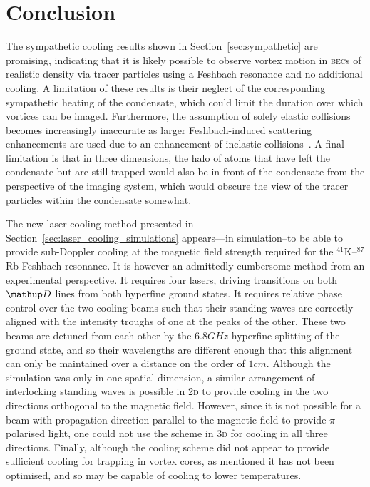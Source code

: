 \section{Conclusion}

The sympathetic cooling results shown in Section~\ref{sec:sympathetic} are promising, indicating that it is likely possible to observe vortex motion in \textsc{bec}s of realistic density via tracer particles using a Feshbach resonance and no additional cooling. A limitation of these results is their neglect of the corresponding sympathetic heating of the condensate, which could limit the duration over which vortices can be imaged. Furthermore, the assumption of solely elastic collisions becomes increasingly inaccurate as larger Feshbach-induced scattering enhancements are used due to an enhancement of inelastic collisions~\cite{stenger_strongly_1999}. A final limitation is that in three dimensions, the halo of atoms that have left the condensate but are still trapped would also be in front of the condensate from the perspective of the imaging system, which would obscure the view of the tracer particles within the condensate somewhat.

The new laser cooling method presented in Section~\ref{sec:laser_cooling_simulations} appears---in simulation--to be able to provide sub-Doppler cooling at the magnetic field strength required for the $^{41}$K--$^{87}$Rb Feshbach resonance. It is however an admittedly cumbersome method from an experimental perspective. It requires four lasers, driving transitions on both $\up{D}$ lines from both hyperfine ground states. It requires relative phase control over the two cooling beams such that their standing waves are correctly aligned with the intensity troughs of one at the peaks of the other. These two beams are detuned from each other by the $6.8\unit{GHz}$ hyperfine splitting of the ground state, and so their wavelengths are different enough that this alignment can only be maintained over a distance on the order of $1\unit{cm}$. Although the simulation was only in one spatial dimension, a similar arrangement of interlocking standing waves is possible in \textsc{2d} to provide cooling in the two directions orthogonal to the magnetic field. However, since it is not possible for a beam with propagation direction parallel to the magnetic field to provide $\pi-$polarised light, one could not use the scheme in \textsc{3d} for cooling in all three directions. Finally, although the cooling scheme did not appear to provide sufficient cooling for trapping in vortex cores, as mentioned it has not been optimised, and so may be capable of cooling to lower temperatures.